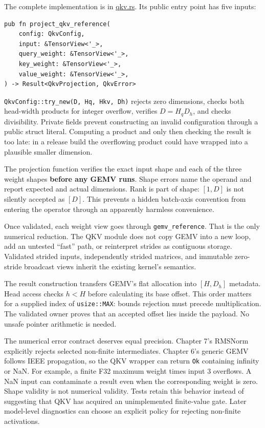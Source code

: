 The complete implementation is in
\href{https://github.com/hermonai/inside-the-llm-engine/blob/astra-visual-rewrite/code/mini-engine/crates/engine0/src/qkv.rs}{qkv.rs}.
Its public entry point has five inputs:

\begin{verbatim}
pub fn project_qkv_reference(
    config: QkvConfig,
    input: &TensorView<'_>,
    query_weight: &TensorView<'_>,
    key_weight: &TensorView<'_>,
    value_weight: &TensorView<'_>,
) -> Result<QkvProjection, QkvError>
\end{verbatim}

\texttt{QkvConfig::try\_new(D,\ Hq,\ Hkv,\ Dh)} rejects zero dimensions,
checks both head-width products for integer overflow, verifies
\(D=H_qD_h\), and checks divisibility. Private fields prevent
constructing an invalid configuration through a public struct literal.
Computing a product and only then checking the result is too late: in a
release build the overflowing product could have wrapped into a
plausible smaller dimension.

The projection function verifies the exact input shape and each of the
three weight shapes \textbf{before any GEMV runs}. Shape errors name the
operand and report expected and actual dimensions. Rank is part of
shape: \([1,D]\) is not silently accepted as \([D]\). This prevents a
hidden batch-axis convention from entering the operator through an
apparently harmless convenience.

Once validated, each weight view goes through \texttt{gemv\_reference}.
That is the only numerical reduction. The QKV module does not copy GEMV
into a new loop, add an untested ``fast'' path, or reinterpret strides
as contiguous storage. Validated strided inputs, independently strided
matrices, and immutable zero-stride broadcast views inherit the existing
kernel's semantics.

The result construction transfers GEMV's flat allocation into
\([H,D_h]\) metadata. Head access checks \(h<H\) before calculating its
base offset. This order matters for a supplied index of
\texttt{usize::MAX}: bounds rejection must precede multiplication. The
validated owner proves that an accepted offset lies inside the payload.
No unsafe pointer arithmetic is needed.

The numerical error contract deserves equal precision. Chapter 7's
RMSNorm explicitly rejects selected non-finite intermediates. Chapter
6's generic GEMV follows IEEE propagation, so the QKV wrapper can return
\texttt{Ok} containing infinity or NaN. For example, a finite F32
maximum weight times input 3 overflows. A NaN input can contaminate a
result even when the corresponding weight is zero. Shape validity is not
numerical validity. Tests retain this behavior instead of suggesting
that QKV has acquired an unimplemented finite-value gate. Later
model-level diagnostics can choose an explicit policy for rejecting
non-finite activations.

